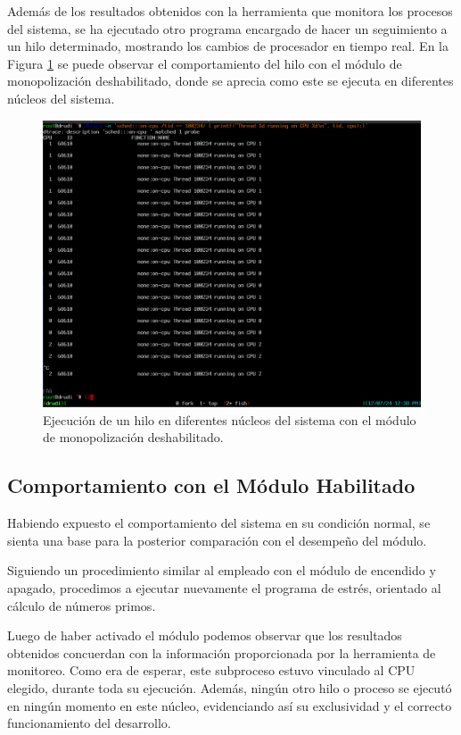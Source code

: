 Además de los resultados obtenidos con la herramienta que monitora los procesos del sistema, se ha ejecutado otro programa encargado de hacer un seguimiento a un hilo determinado, mostrando los cambios de procesador en tiempo real. En la Figura \ref{fig:dtrace_disabled} se puede observar el comportamiento del hilo con el módulo de monopolización deshabilitado, donde se aprecia como este se ejecuta en diferentes núcleos del sistema.\par

\begin{figure}[H]
    \centering
    \includegraphics[width=1\textwidth]{images/dtrace_disabled.png}
    \caption{Ejecución de un hilo en diferentes núcleos del sistema con el módulo de monopolización deshabilitado.}
    \label{fig:dtrace_disabled}
\end{figure}


\subsection{Comportamiento con el Módulo Habilitado}
Habiendo expuesto el comportamiento del sistema en su condición normal, se sienta una base para la posterior comparación con el desempeño del módulo.\par

Siguiendo un procedimiento similar al empleado con el módulo de encendido y apagado, procedimos a ejecutar nuevamente el programa de estrés, orientado al cálculo de números primos.\par

Luego de haber activado el módulo podemos observar que los resultados obtenidos concuerdan con la información proporcionada por la  herramienta de monitoreo. Como era de esperar, este subproceso estuvo vinculado al CPU elegido, durante toda su ejecución. Además, ningún otro hilo o proceso se ejecutó en ningún momento en este núcleo, evidenciando así su exclusividad y el correcto funcionamiento del desarrollo.\par

